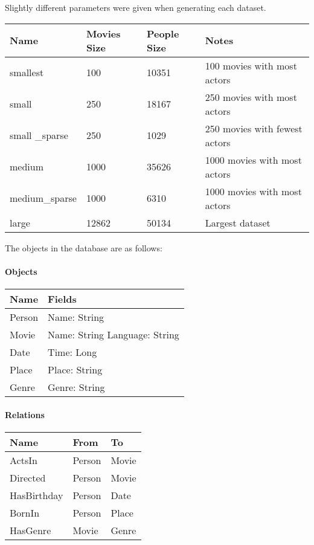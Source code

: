 \documentclass[12pt,a4paper,twoside,openright]{report}
\begin{document}
{{Slightly different parameters were given when generating each dataset.

\begin{center}
	\begin{tabular}{ |p{3cm}||p{3cm}|p{3cm}||p{3cm}|  }	
	\hline
        Name & Movies Size & People Size & Notes \\ \hline
        smallest & 100 & 10351 & 100 movies with most actors \\ \hline
        small & 250 & 18167 & 250 movies with most actors \\ \hline
        small _sparse & 250 & 1029 & 250 movies with fewest actors \\ \hline
        medium & 1000 & 35626 & 1000 movies with most actors \\ \hline
        medium_sparse & 1000 & 6310 & 1000 movies with most actors \\ \hline 
       large & 12862 & 50134 & Largest dataset \\ \hline
	\end{tabular}
\end{center}

The objects in the database are as follows:
\paragraph{Objects}
\begin{center}
	\begin{tabular}{ |p{3cm}| p{3cm}|}
	\hline
	Name & Fields \\ \hline
	Person & Name: String \\ \hline
	Movie & Name: String Language: String \\ \hline
	Date & Time: Long \\ \hline
	Place & Place: String \\ \hline
	Genre &	Genre: String \\ \hline
	\end{tabular}
\end{center}

\paragraph{Relations}
\begin{center}
	\begin{tabular}{ |p{3cm}|| p{3cm}| p{3cm}|}
	\hline
		Name &  From & To \\ \hline
		ActsIn & Person & Movie \\ \hline
		Directed & Person & Movie\\ \hline
		HasBirthday &Person & Date\\ \hline
		BornIn & Person & Place\\ \hline
		HasGenre & Movie & Genre\\ \hline
	\end{tabular}
\end{center}

}}
\end{document}
